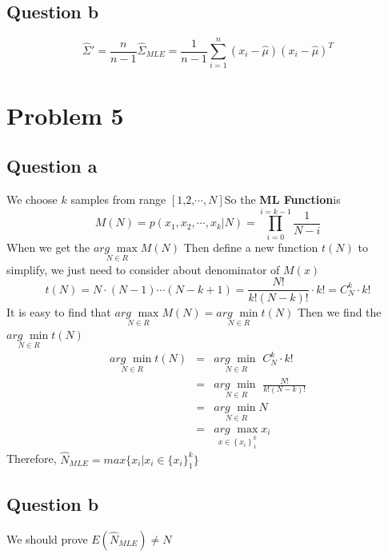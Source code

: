 \documentclass[12pt,letterpaper]{article}
\begin{document}
\subsection*{Question b}
\begin{equation}
  \hat\Sigma'=\frac{n}{n-1}\hat\Sigma_{MLE}=\frac1{n-1}\sum^n_{i=1}(x_i-\hat\mu)(x_i-\hat\mu)^T
\end{equation}


\section*{Problem 5}
\subsection*{Question a}
We choose $k$ samples from range $\left[ \text{1,2,}\cdots ,N \right]$So the {\bf ML Function}is
\begin{equation}\label{5aeq1}
  M(N)=p\left( x_1,x_2,\cdots ,x_k|N \right) =\prod_{i=0}^{i=k-1}{\frac{1}{N-i}}
\end{equation}
When we get the $\underset{N\in R}{arg\,\,\max}M\left( N \right)$
Then define a new function $t(N)$ to simplify, we just need to consider about denominator of $M(x)$
\begin{equation}\label{5aeq2}
  t\left( N \right) =N\cdot \left( N-1 \right) \cdots \left( N-k+1 \right) =\frac{N!}{k!\left( N-k \right) !}\cdot k!=C_{N}^{k}\cdot k!
\end{equation}
It is easy to find that $\underset{N\in R}{arg\,\,\max}M\left( N \right)=\underset{N\in R}{arg\,\,\min}t\left( N \right)$
Then we find the $\underset{N\in R}{arg\,\,\min}t\left( N\right)$
\begin{eqnarray}\label{5aeq3}
  \underset{N\in R}{arg\,\,\min}t\left( N \right)
  &=& \underset{N\in R}{arg\,\,\min}\,\,C_{N}^{k}\cdot k! \\
  &=& \underset{N\in R}{arg\,\,\min}\,\,\frac{N!}{k!\left( N-k \right) !} \nonumber \nonumber \\
  &=& \underset{N\in R}{arg\,\,\min}N \nonumber \\
  &=& \underset{x\in \left\{ x_i \right\} _{1}^{k}}{arg\,\,\max}x_i \nonumber
\end{eqnarray}
Therefore, $\hat{N}_{MLE}=max\{x_i|x_i\in \{ x_i \} _{1}^{k}\}$
\subsection*{Question b}
We should prove $E(\hat{N}_{MLE})\ne N$
\end{document}
